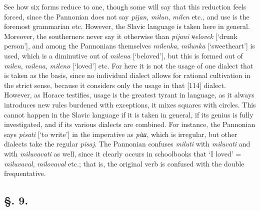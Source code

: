 See how six forms reduce to one, though some will say that this reduction feels forced, since the Pannonian does not say \textit{pijan}, \textit{milun}, \textit{milen} etc., and use is the foremost grammarian etc. However, the Slavic language is taken here in general. Moreover, the southerners never say it otherwise than \textit{pijani чelovek} [‘drunk person’], and among the Pannonians themselves \textit{milenka}, \textit{milunka} [‘sweetheart’] is used, which is a diminutive out of \textit{milena} [‘beloved’], but this is formed out of \textit{milen}, \textit{milena}, \textit{mileno} [‘loved’] etc. For here it is not the usage of one dialect that is taken as the basis, since no individual dialect allows for rational cultivation in the strict sense, because it considers only the usage in that [114] dialect. However, as Horace testifies, usage is the greatest tyrant in language, as it always introduces new rules burdened with exceptions, it mixes squares with circles. This cannot happen in the Slavic language if it is taken in general, if its genius is fully investigated, and if its various dialects are combined. For instance, the Pannonian says \textit{pisati} [‘to write’] in the imperative as \textit{piш}, which is irregular, but other dialects take the regular \textit{pisaj}. The Pannonian confuses \textit{miluti} with \textit{miluvati} and with \textit{miluvavati} as well, since it clearly occurs in schoolbooks that ‘I loved’ = \textit{miluvaval}, \textit{milovaval} etc.; that is, the original verb is confused with the double frequentative.

\subsection*{\hspace*{\fill}§. 9.\hspace*{\fill}}

